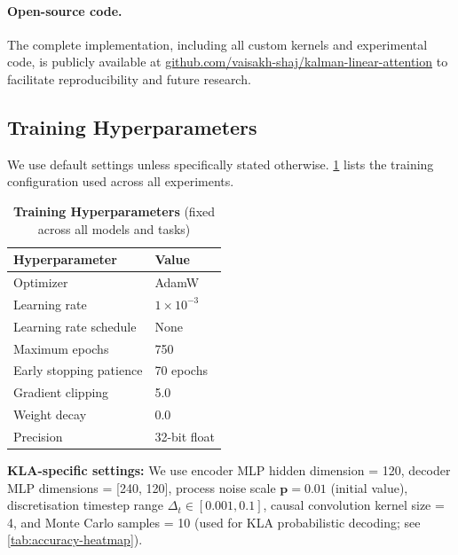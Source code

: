 \documentclass{article}
\newcommand{\our}{\textsc{KLA}\xspace}
\begin{document}
\paragraph{Open-source code.}
The complete implementation, including all custom kernels and experimental code, is publicly available at \href{https://github.com/vaisakh-shaj/kalman-linear-attention}{github.com/vaisakh-shaj/\allowbreak kalman-linear-attention} to facilitate reproducibility and future research.


\subsection{Training Hyperparameters}
\label{sec:training-hyperparams-sub}

We use default settings unless specifically stated otherwise. \cref{tab:training-hyperparams} lists the training configuration used across all experiments.

\begin{table}[h]
\caption{\textbf{Training Hyperparameters} (fixed across all models and tasks)}
\label{tab:training-hyperparams}
\begin{center}
\begin{small}
\begin{tabular}{ll}
\toprule
\textbf{Hyperparameter} & \textbf{Value} \\
\midrule
Optimizer & AdamW \\
Learning rate & $1 \times 10^{-3}$ \\
Learning rate schedule & None \\
Maximum epochs & 750 \\
Early stopping patience & 70 epochs \\
Gradient clipping & 5.0 \\
Weight decay & 0.0 \\
Precision & 32-bit float \\
\bottomrule
\end{tabular}
\end{small}
\end{center}
\vskip -0.1in
\end{table}

\noindent\textbf{\our-specific settings:} We use encoder MLP hidden dimension = 120, decoder MLP dimensions = [240, 120], process noise scale $\mathbf{p} = 0.01$ (initial value), discretisation timestep range $\Delta_t \in [0.001, 0.1]$, causal convolution kernel size = 4, and Monte Carlo samples = 10 (used for \our{} probabilistic decoding; see \cref{tab:accuracy-heatmap}).
\end{document}
